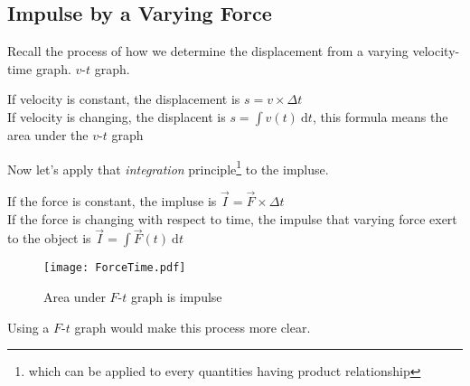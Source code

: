 \documentclass[a4paper]{tufte-handout}
\def\d{{\mathrm{d}}}
\begin{document}
\subsection{Impulse by a Varying Force}
Recall the process of how we determine the displacement from a varying velocity-time graph. $v$-$t$ graph. 

\noindent If velocity is constant, the displacement is $s= v \times \Delta t$\\
\noindent If velocity is changing, the displacent is $s = \int v(t) \ \d t$, this formula means the area under the $v$-$t$ graph

Now let's apply that \emph{integration} principle\footnote{which can be applied to every quantities having product relationship} to the impluse.

\noindent If the force is constant, the impluse is $\vec{I} = \vec{F} \times \Delta t$\\
\noindent If the force is changing with respect to time, the impulse that varying force exert to the object is $\vec{I} = \int \vec{F}(t)\ \d t$

\begin{figure}[t]
\centering
\texttt{[image: ForceTime.pdf]}
\caption{Area under $F$-$t$ graph is impulse}
\end{figure}
Using a $F$-$t$ graph would make this process more clear.
\end{document}
